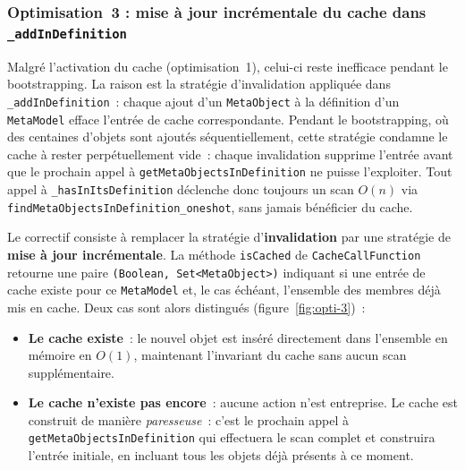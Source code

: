 \subsubsection{Optimisation~3 : mise à jour incrémentale du cache dans
\texttt{\_addInDefinition}}

Malgré l'activation du cache (optimisation~1), celui-ci reste inefficace
pendant le bootstrapping. La raison est la stratégie d'invalidation
appliquée dans \texttt{\_addInDefinition}~: chaque ajout d'un
\texttt{MetaObject} à la définition d'un \texttt{MetaModel} efface
l'entrée de cache correspondante. Pendant le bootstrapping, où des centaines
d'objets sont ajoutés séquentiellement, cette stratégie condamne le cache
à rester perpétuellement vide~: chaque invalidation supprime l'entrée avant
que le prochain appel à \texttt{getMetaObjectsInDefinition} ne puisse
l'exploiter. Tout appel à \texttt{\_hasInItsDefinition} déclenche donc
toujours un scan $O(n)$ via \texttt{findMetaObjectsInDefinition\_oneshot},
sans jamais bénéficier du cache.

Le correctif consiste à remplacer la stratégie d'\textbf{invalidation} par
une stratégie de \textbf{mise à jour incrémentale}. La méthode
\texttt{isCached} de \texttt{CacheCallFunction} retourne une paire
\texttt{(Boolean,~Set<MetaObject>)} indiquant si une entrée de cache existe
pour ce \texttt{MetaModel} et, le cas échéant, l'ensemble des membres déjà
mis en cache. Deux cas sont alors distingués (figure~\ref{fig:opti-3})~:

\begin{itemize}
    \item \textbf{Le cache existe}~: le nouvel objet est inséré directement
    dans l'ensemble en mémoire en $O(1)$, maintenant l'invariant du cache
    sans aucun scan supplémentaire.
    \item \textbf{Le cache n'existe pas encore}~: aucune action n'est
    entreprise. Le cache est construit de manière \textit{paresseuse}~:
    c'est le prochain appel à \texttt{getMetaObjectsInDefinition} qui
    effectuera le scan complet et construira l'entrée initiale, en incluant
    tous les objets déjà présents à ce moment.
\end{itemize}

